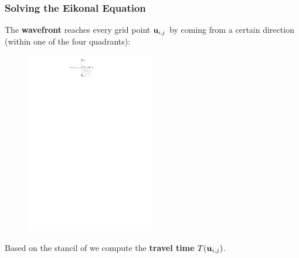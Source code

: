\documentclass[aspectratio=169,handout]{beamer}
\begin{document}
\begin{frame}
	\frametitle{Solving the Eikonal Equation}
	The \textbf{wavefront} reaches every grid point $\mathbf{u}_{i,j}$ by coming from a certain direction (within one of the four quadrants):
	\begin{figure}
		\includegraphics[width=0.5\textwidth]{./figs/stencil.pdf}
	\end{figure}
	Based on the stancil of we compute the \textbf{travel time} $T(\mathbf{u}_{i,j})$.
\end{frame}
\end{document}
